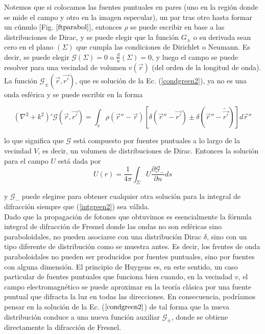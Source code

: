     Notemos que si colocamos las fuentes puntuales en pares (uno en la región donde se mide el campo y otro en la imagen especular), un par tras otro hasta formar un cúmulo [Fig. $\ref{ftparabol}$], entonces $\rho$ se puede escribir en base a las distribuciones de Dirac, y se puede elegir que la función $G_{\pm}$ o su derivada sean cero en el plano $(\Sigma)$ que cumpla las condiciones de Dirichlet o Neumann. Es decir, se puede elegir $\mathcal{G}(\Sigma) = 0$ o $\frac{\mathcal{G}}{n} (\Sigma) = 0$, y luego el campo se puede resolver para una vecindad de volumen $v(\vec{r})$ (del orden de la longitud de onda).
    La función $\mathcal{G}_{\pm}(\vec{r}, \vec{r'})$, que es solución de la Ec. (\ref{condgreen2}), ya no es una onda esférica y se puede escribir en la forma
    
    \begin{equation}
        (\nabla^{2} + k^{2})'\mathcal{G}(\vec{r}, \vec{r'}) = \int_{v} \rho(\vec{r}'' - \vec{r}) [\delta(\vec{r}'' - \vec{r'}) \pm \delta(\vec{r}'' - \widetilde{\vec{r'}})] d\vec{r}''
    \end{equation}
    
    lo que significa que $\mathcal{G}$ está compuesto por fuentes puntuales a lo largo de la vecindad $V$, es decir, un volumen de distribuciones de Dirac.
    Entonces la solución para el campo $U$ está dada por
    \begin{equation}
        U(r) = \frac{1}{4\pi} \int_{\Sigma} U \frac{\partial \mathcal{G}_{-}}{\partial n} ds
    \end{equation}
    
    y $\mathcal{G}_{-}$ puede elegirse para obtener cualquier otra solución para la integral de difracción siempre que (\ref{intgreen2}) sea válida.\\
    
    Dado que la propagación de fotones que obtuvimos es esencialmente la fórmula integral de difracción de Fresnel donde las ondas no son esféricas sino paraboloidales, no pueden asociarse con una distribución Dirac $\delta$, sino con un tipo diferente de distribución como se muestra antes. Es decir, los frentes de onda paraboloidales no pueden ser producidos por fuentes puntuales, sino por fuentes con alguna dimensión. El principio de Huygens es, en este sentido, un caso particular de fuentes puntuales que funciona bien cuando, en la vecindad $v$, el campo electromagnético se puede aproximar en la teoría clásica por una fuente puntual que difracta la luz en todas las direcciones. En consecuencia, podríamos pensar en la solución de la Ec. ($\ref{condgreen2}$) de tal forma que la nueva distribución conduce a una nueva función auxiliar $\mathcal{G}_{\pm}$, donde se obtiene directamente la difracción de Fresnel. \\
    
